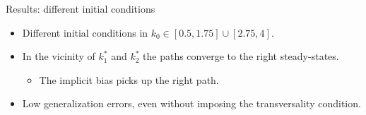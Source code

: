 \documentclass[aspectratio=169,10pt]{beamer}
\begin{document}
\begin{frame}[label = ncg_multi_results]{Results: different initial conditions}
	
	\begin{minipage}[t]{0.4\textwidth}
	\end{minipage}
	\hfill%
	\begin{minipage}[t]{0.5\textwidth}\raggedleft
		\begin{itemize}
			\item Different initial conditions in $k_0 \in [0.5,1.75]\cup[2.75,4]$.
			\smallskip
			\item In the vicinity of $k_1^*$ and $k_2^*$ the paths converge to the right steady-states.			\smallskip
			\begin{itemize}
				\item The implicit bias picks up the right path.
			\end{itemize}
			\smallskip
			\item Low generalization errors, even without imposing the transversality condition.
		\end{itemize}
	\end{minipage}
\end{frame}
\end{document}
